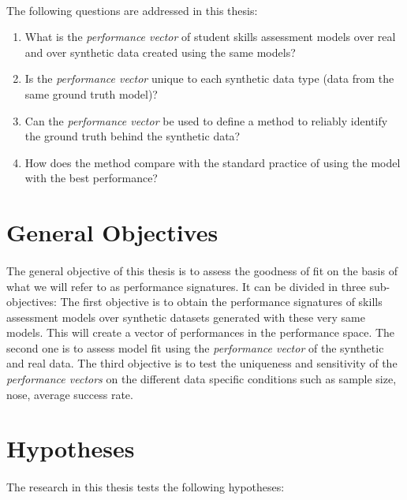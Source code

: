 \paragraph{}The following questions are addressed in this thesis:

\begin{enumerate}
\item What is the \textit{performance vector} of student skills assessment models over real and over synthetic data created using the same models?
\item Is the \textit{performance vector} unique to each synthetic data type (data from the same ground truth model)?
\item Can the \textit{performance vector} be used to define a method to reliably identify the ground truth behind the synthetic data?
\item How does the method compare with the standard practice of using the model with the best performance? %
\end{enumerate}


\section{General Objectives}

\paragraph{}The general objective of this thesis is to assess the goodness of fit on the basis of what we will refer to as performance signatures. It can be divided in three sub-objectives: The first objective is to obtain the performance signatures of skills assessment models over synthetic datasets generated with these very same models. This will create a vector of performances in the performance space. The second one is to assess model fit using the \textit{performance vector} of the synthetic and real data. The third objective is to test the uniqueness and sensitivity of the \textit{performance vectors} on the different data specific conditions such as sample size, nose, average success rate.

\section{Hypotheses}
\paragraph{}The research in this thesis tests the following hypotheses:
